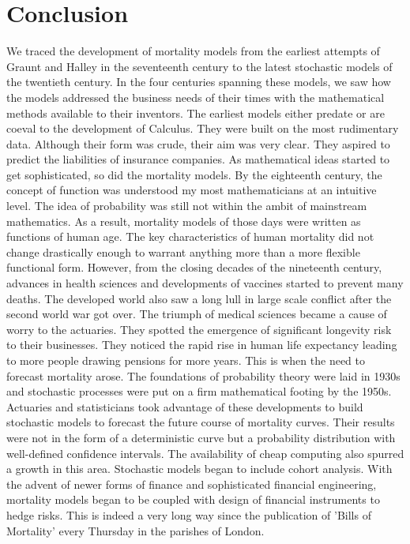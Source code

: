 \documentclass{article}
\numberwithin{equation}{section}
\begin{document}
\section{Conclusion}
We traced the development of mortality models from the earliest attempts of
Graunt and Halley in the seventeenth century to the latest stochastic models
of the twentieth century. In the four centuries spanning these models, we
saw how the models addressed the business needs of their times with the
mathematical methods available to their inventors. The earliest models either
predate or are coeval to the development of Calculus. They were built on the
most rudimentary data. Although their form was crude, their aim was very clear.
They aspired to predict the liabilities of insurance companies. As mathematical
ideas started to get sophisticated, so did the mortality models. By the
eighteenth century, the concept of function was understood my most 
mathematicians at an intuitive level. The idea of probability was still not
within the ambit of mainstream mathematics. As a result, mortality models of
those days were written as functions of human age. The key characteristics
of human mortality did not change drastically enough to warrant anything more
than a more flexible functional form. However, from the closing decades of the
nineteenth century, advances in health sciences and developments of vaccines 
started to prevent many deaths. The developed world also saw a long lull in 
large scale conflict after the second world war got over. The triumph of
medical sciences became a cause of worry to the actuaries. They spotted the
emergence of significant longevity risk to their businesses. They noticed the
rapid rise in human life expectancy leading to more people drawing pensions
for more years. This is when the need to forecast mortality arose. The 
foundations of probability theory were laid in 1930s and stochastic processes
were put on a firm mathematical footing by the 1950s. Actuaries and 
statisticians took advantage of these developments to build stochastic models
to forecast the future course of mortality curves. Their results were not
in the form of a deterministic curve but a probability distribution with
well-defined confidence intervals. The availability of cheap computing also
spurred a growth in this area. Stochastic models began to include cohort 
analysis. With the advent of newer forms of finance and sophisticated
financial engineering, mortality models began to be coupled with design of
financial instruments to hedge risks. This is indeed a very long way since the
publication of 'Bills of Mortality' every Thursday in the parishes of London.


\end{document}
